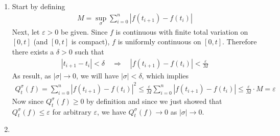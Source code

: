 \documentclass[12pt]{article}
\theoremstyle{plain}
\theoremstyle{definition}
\theoremstyle{remark}
\begin{document}
\begin{enumerate}
\begin{enumerate}
      \item %
        Start by defining
        \begin{align*}
          M = \sup_{\sigma} \sum^n_{i=0} |f(t_{i+1})-f(t_i)|
        \end{align*}
        Next, let $\varepsilon>0$ be given. Since $f$ is continuous with
        finite total variation on $[0,t]$ (and $[0,t]$ is compact), $f$
        is uniformly continuous on $[0,t]$. Therefore there exists a
        $\delta>0$ such that
        \begin{align*}
          |t_{i+1}-t_i|<\delta
          \quad \Rightarrow \quad
          |f(t_{i+1}) - f(t_i)|< \frac{\varepsilon}{M}
        \end{align*}
        As result, as $|\sigma|\rightarrow0$, we will have
        $|\sigma|<\delta$, which implies
        \begin{align*}
          Q^\sigma_t(f) = \sum^n_{i=0} |f(t_{i+1})-f(t_i)|^2
          \leq
          \frac{\varepsilon}{M}
          \sum^n_{i=0} |f(t_{i+1})-f(t_i)|
          \leq \frac{\varepsilon}{M} \cdot M
          = \varepsilon
        \end{align*}
        Now since $Q^\sigma_t(f)\geq 0$ by definition and since we just
        showed that $Q^\sigma_t(f)\leq\varepsilon$ for arbitrary
        $\varepsilon$, we have $Q^\sigma_t(f)\rightarrow 0$ as
        $|\sigma|\rightarrow0$.

      \item %


\end{enumerate}
\end{enumerate}
\end{document}
